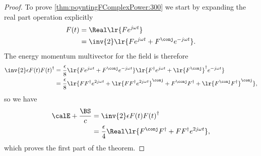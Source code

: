 %
%


\begin{proof}
To prove \cref{thm:poyntingFComplexPower:300} we start by expanding the real part operation explicitly
\begin{equation}\label{eqn:poyntingFComplexPower:20}
\begin{aligned}
F(t)
&= \Real\lr{ F e^{j \omega t} } \\
&= \inv{2} \lr{ F e^{j \omega t} + F^\conj e^{-j\omega t} }.
\end{aligned}
\end{equation}
The energy momentum multivector for the field is therefore
\begin{equation}\label{eqn:poyntingFComplexPower:40}
\begin{aligned}
\inv{2} \epsilon F(t) {F(t)}^\dagger
&=
\frac{\epsilon}{8}
\lr{
F e^{j \omega t} + F^\conj e^{-j\omega t}
}
\lr{
F^\dagger e^{j \omega t} + \lr{F^\conj}^\dagger e^{-j\omega t}
} \\
&=
\frac{\epsilon}{8}
\lr{
F F^\dagger e^{2 j \omega t}
+
\lr{ F F^\dagger e^{2 j \omega t} }^\conj
+
F^\conj F^\dagger + \lr{ F^\conj F^\dagger }^\conj
},
\end{aligned}
\end{equation}
so we have
\begin{equation}\label{eqn:poyntingFComplexPower:60}
\begin{aligned}
\calE + \frac{\BS}{c}
&= \inv{2} \epsilon F(t) {F(t)}^\dagger \\
&= \frac{\epsilon}{4} \Real \lr{ F^\conj F^\dagger + F F^\dagger e^{2 j \omega t} },
\end{aligned}
\end{equation}
which proves the first part of the theorem.


\end{proof}
